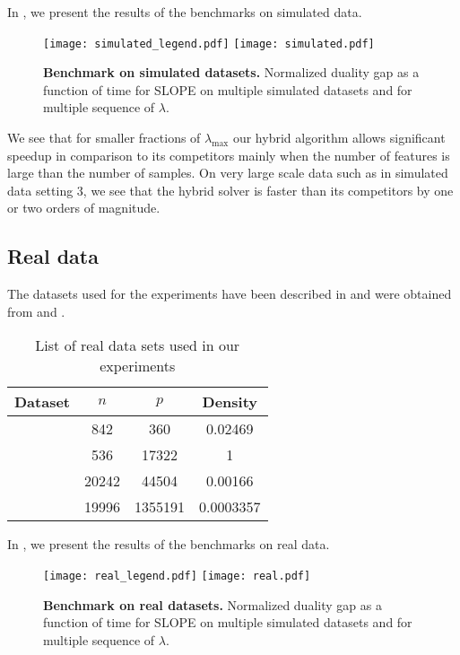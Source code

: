 In , we present the results of the benchmarks on simulated data.

\begin{figure*}[!t]
  \centering
  \texttt{[image: simulated\_legend.pdf]}
  \texttt{[image: simulated.pdf]}
  \caption{\textbf{Benchmark on simulated datasets.} Normalized duality gap as a function of time for SLOPE on multiple simulated datasets and for multiple sequence of $\lambda$.}
  \label{fig:simulated}
\end{figure*}

We see that for smaller fractions of $\lambda_{\text{max}}$ our hybrid algorithm allows significant speedup in comparison to its competitors mainly when the number of features is large than the number of samples.
On very large scale data such as in simulated data setting $3$, we see that the hybrid solver is faster than its competitors by one or two orders of magnitude.

\subsection{Real data}
\label{sec:experiments-real-data}

The datasets used for the experiments have been described in  and were obtained from \textcite{chang2011,chang2016} and \textcite{breheny2022}.

\begin{table}[hbt]
  \centering
  \caption{List of real data sets used in our experiments}
  \label{tab:real-data}
  \begin{tabular}{
      l
      S[table-format=5.0,round-mode=off]
      S[table-format=7.0,round-mode=off]
      S[table-format=1.5,round-mode=figures,round-precision=2]
    }
    \toprule
    Dataset            & \(n\) & \(p\)   & {Density} \\ \midrule
     & 842   & 360     & 0.02469   \\
       & 536   & 17322   & 1         \\
         & 20242 & 44504   & 0.00166   \\
       & 19996 & 1355191 & 0.0003357 \\ \bottomrule
  \end{tabular}
\end{table}

In , we present the results of the benchmarks on real data.

\begin{figure*}[!t]
  \centering
  \texttt{[image: real\_legend.pdf]}
  \texttt{[image: real.pdf]}
  \caption{\textbf{Benchmark on real datasets.} Normalized duality gap as a function of time for SLOPE on multiple simulated datasets and for multiple sequence of $\lambda$.}
  \label{fig:real-data}
\end{figure*}

